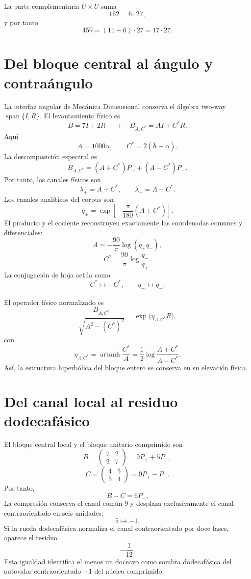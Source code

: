 \documentclass[11pt,a4paper]{article}
\newcommand{\Span}{\operatorname{span}}
\begin{document}
La parte complementaria $U\times U$ suma
\[
162=6\cdot27,
\]
y por tanto
\[
459=(11+6)\cdot27=17\cdot27.
\]

\section{Del bloque central al ángulo y contraángulo}

La interfaz angular de Mecánica Dimensional conserva el álgebra two-way $\Span\{I,R\}$. El levantamiento físico es
\[
\boxed{
B=7I+2R
\quad\longmapsto\quad
B_{A,C^\ast}=AI+C^\ast R.}
\]
Aquí
\[
A=1000\alpha,
\qquad
C^\ast=2(\bar\hbar+\alpha).
\]
La descomposición espectral es
\[
\boxed{
B_{A,C^\ast}
=(A+C^\ast)P_+
+(A-C^\ast)P_- .}
\]
Por tanto, los canales físicos son
\[
\lambda_+=A+C^\ast,
\qquad
\lambda_-=A-C^\ast.
\]
Los canales analíticos del corpus son
\[
\boxed{
q_\pm=
\exp\left[-\frac{\pi}{180}(A\pm C^\ast)\right].}
\]
El producto y el cociente reconstruyen exactamente las coordenadas comunes y diferenciales:
\[
\boxed{
A=-\frac{90}{\pi}\log(q_+q_-),}
\]
\[
\boxed{
C^\ast=\frac{90}{\pi}\log\frac{q_-}{q_+}.}
\]
La conjugación de hoja actúa como
\[
C^\ast\mapsto-C^\ast,
\qquad
q_+\leftrightarrow q_-.
\]

El operador físico normalizado es
\[
\frac{B_{A,C^\ast}}{\sqrt{A^2-(C^\ast)^2}}
=
\exp\bigl(\eta_{A,C^\ast}R\bigr),
\]
con
\[
\eta_{A,C^\ast}
=
\operatorname{artanh}\frac{C^\ast}{A}
=
\frac12\log\frac{A+C^\ast}{A-C^\ast}.
\]
Así, la estructura hiperbólica del bloque entero se conserva en su elevación física.

\section{Del canal local al residuo dodecafásico}

El bloque central local y el bloque unitario comprimido son
\[
B=\begin{pmatrix}7&2\\2&7\end{pmatrix}
=9P_+ +5P_-,
\]
\[
C=\begin{pmatrix}4&5\\5&4\end{pmatrix}
=9P_+ -P_-.
\]
Por tanto,
\[
\boxed{B-C=6P_-.}
\]
La compresión conserva el canal común $9$ y desplaza exclusivamente el canal contraorientado en seis unidades:
\[
5\longmapsto-1.
\]
Si la rueda dodecafásica normaliza el canal contraorientado por doce fases, aparece el residuo
\[
\boxed{-\frac1{12}.}
\]
Esta igualdad identifica el menos un doceavo como sombra dodecafásica del autovalor contraorientado $-1$ del núcleo comprimido.
\end{document}
